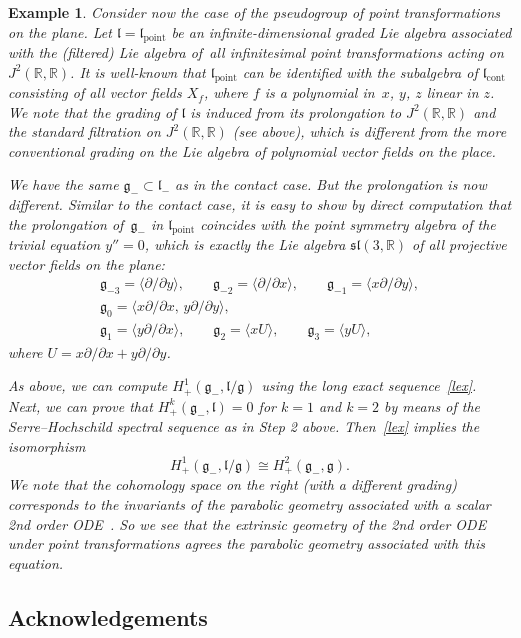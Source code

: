 \documentclass[10pt,a4paper]{amsart}
\newcommand{\R}{\mathbb R}
\newcommand{\g}{\mathfrak g}
\newcommand{\lf}{\mathfrak l}
\newtheorem{ex}[thm]{Example}
\numberwithin{equation}{section}
\begin{document}
\begin{ex}
	Consider now the case of the pseudogroup of point transformations on the plane. Let $\lf=\lf_{\textrm{point}}$ be an infinite-dimensional graded Lie algebra associated with the (filtered) Lie algebra of~all infinitesimal point transformations acting on $J^2(\R,\R)$. It is well-known that $\lf_{\textrm{point}}$ can be identified with the subalgebra of $\lf_{\textrm{cont}}$ consisting of all vector fields $X_f$, where $f$ is a polynomial in~$x$, $y$, $z$ linear in $z$. We note that the grading of $\lf$ is induced from its prolongation to $J^2(\R,\R)$ and the standard filtration on $J^2(\R,\R)$ (see above), which is different from the more conventional grading on the Lie algebra of polynomial vector fields on the place.
	
	We have the same $\g_{-}\subset \lf_{-}$ as in the contact case. But the prolongation is now different. Similar to the contact case, it is easy to show by direct computation that the prolongation of~$\g_{-}$ in $\lf_{\textrm{point}}$ coincides with the point symmetry algebra of the trivial equation $y''=0$, which is exactly the Lie algebra $\mathfrak{sl}(3,\R)$ of all projective vector fields on the plane:
	\begin{gather*}
	\g_{-3} = \langle \partial/\partial y \rangle,\qquad
	\g_{-2} = \langle \partial/\partial x \rangle, \qquad
	\g_{-1} = \langle x\partial/\partial y \rangle, \\
	\g_{0} = \langle x\partial/\partial x, \, y\partial/\partial y\rangle,\\
	\g_{1} = \langle y\partial/\partial x \rangle, \qquad
	\g_{2} = \langle x U \rangle, \qquad
	\g_{3} = \langle y U \rangle,
	\end{gather*}
	where $U= x\partial/\partial x+y\partial/\partial y$.
	
	As above, we can compute $H_{+}^1(\g_{-},\lf/\g)$ using the long exact sequence~\eqref{lex}. Next, we can prove that $H^k_{+}(\g_{-},\lf)=0$ for $k=1$ and $k=2$ by means of the Serre--Hochschild spectral sequence as in Step 2 above. Then~\eqref{lex} implies the isomorphism
	\[
	H^1_{+}(\g_{-}, \lf/\g) \cong H^2_{+}(\g_{-},\g).
	\]
	We note that the cohomology space on the right (with a different grading) corresponds to the invariants of the parabolic geometry associated with a scalar 2nd order ODE~\cite{capslovak,tan79}. So we see that the extrinsic geometry of the 2nd order ODE under point transformations agrees the parabolic geometry associated with this equation.
\end{ex}

\subsection*{Acknowledgements}
\end{document}
